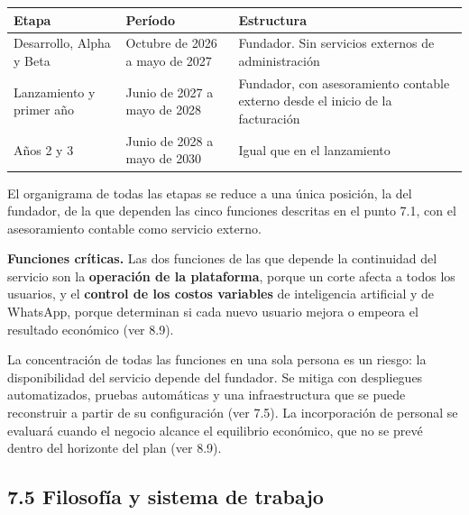 {\def\LTcaptype{none} %
\begin{longtable}[]{@{}
  >{\raggedright\arraybackslash}p{}
  >{\raggedright\arraybackslash}p{}
  >{\raggedright\arraybackslash}p{}@{}}
\toprule\noalign{}
\begin{minipage}[b]{\linewidth}\raggedright
Etapa
\end{minipage} & \begin{minipage}[b]{\linewidth}\raggedright
Período
\end{minipage} & \begin{minipage}[b]{\linewidth}\raggedright
Estructura
\end{minipage} \\
\midrule\noalign{}
\endhead
\bottomrule\noalign{}
\endlastfoot
Desarrollo, Alpha y Beta & Octubre de 2026 a mayo de 2027 & Fundador.
Sin servicios externos de administración \\
Lanzamiento y primer año & Junio de 2027 a mayo de 2028 & Fundador, con
asesoramiento contable externo desde el inicio de la facturación \\
Años 2 y 3 & Junio de 2028 a mayo de 2030 & Igual que en el
lanzamiento \\
\end{longtable}
}

El organigrama de todas las etapas se reduce a una única posición, la
del fundador, de la que dependen las cinco funciones descritas en el
punto 7.1, con el asesoramiento contable como servicio externo.

\textbf{Funciones críticas.} Las dos funciones de las que depende la
continuidad del servicio son la \textbf{operación de la plataforma},
porque un corte afecta a todos los usuarios, y el \textbf{control de los
costos variables} de inteligencia artificial y de WhatsApp, porque
determinan si cada nuevo usuario mejora o empeora el resultado económico
(ver 8.9).

La concentración de todas las funciones en una sola persona es un
riesgo: la disponibilidad del servicio depende del fundador. Se mitiga
con despliegues automatizados, pruebas automáticas y una infraestructura
que se puede reconstruir a partir de su configuración (ver 7.5). La
incorporación de personal se evaluará cuando el negocio alcance el
equilibrio económico, que no se prevé dentro del horizonte del plan (ver
8.9).

\subsection*{7.5 Filosofía y sistema de
trabajo}\label{filosofuxeda-y-sistema-de-trabajo}


